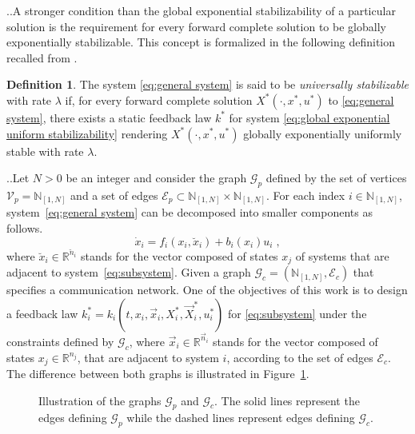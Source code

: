 \documentclass[10pt,twocolumn,twoside]{IEEEtran}
\newcounter{para}
\newcommand\mypara{\par \thesection.\refstepcounter{para}\thepara.\space}
\theoremstyle{plain}
\theoremstyle{definition}
\newtheorem{definition}{Definition}
\theoremstyle{remark}
\begin{document}
\mypara A stronger condition than the global exponential stabilizability of a particular solution is the requirement for every forward complete solution to be globally exponentially stabilizable. This concept is formalized in the following definition recalled from \cite{Manchester2014a}.

\begin{definition}\label{def:US}
	The system \eqref{eq:general system} is said to be \emph{universally stabilizable} with rate $\lambda$ if, for every forward complete solution $X^\ast(\cdot,x^\ast,u^\ast)$ to \eqref{eq:general system}, there exists a static feedback law $k^\ast$ for system \eqref{eq:global exponential uniform stabilizability} rendering $X^\ast(\cdot,x^\ast,u^\ast)$ globally exponentially uniformly stable with rate $\lambda$.
\end{definition}

\mypara Let $N>0$ be an integer and consider the graph $\mathscr{G}_p$ defined by the set of vertices $\mathscr{V}_p=\mathbb{N}_{[1,N]}$ and a set of edges $\mathscr{E}_p\subset\mathbb{N}_{[1,N]}\times\mathbb{N}_{[1,N]}$. For each index $i\in\mathbb{N}_{[1,N]}$, system~\eqref{eq:general system} can be decomposed into smaller components as follows.
\begin{equation}\label{eq:subsystem}
	\dot{x}_i=f_i(x_i,\breve{x}_i)+b_i(x_i)u_i\;,
\end{equation}
where $\breve{x}_i\in\mathbb{R}^{\breve{n}_i}$ stands for the vector composed of states $x_j$ of systems that are adjacent to system~\eqref{eq:subsystem}. Given a graph $\mathscr{G}_c=(\mathbb{N}_{[1,N]},\mathscr{E}_c)$ that specifies a communication network. One of the objectives of this work is to design a feedback law $k_i^\ast=k_i(t,x_i,\vec{x}_i,X_i^\ast,\vec{X}_i^\ast,u_i^\ast)$ for \eqref{eq:subsystem} under the constraints defined by $\mathscr{G}_c$, where $\vec{x}_i\in\mathbb{R}^{\vec{n}_i}$ stands for the vector composed of states $x_j\in\mathbb{R}^{n_j}$, that are adjacent to system $i$, according to the set of edges $\mathscr{E}_c$. The difference between both graphs is illustrated in Figure~\ref{fig:graph different illustration}.

\begin{figure}[htbp!]
	\centering
	\resizebox{.4\columnwidth}{!}{}
	\caption{Illustration of the graphs $\mathscr{G}_p$ and $\mathscr{G}_c$. The solid lines represent the edges defining $\mathscr{G}_p$ while the dashed lines represent edges defining $\mathscr{G}_c$.}
	\label{fig:graph different illustration}
\end{figure}
\end{document}
